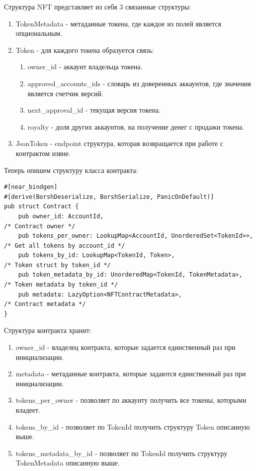 Структура NFT представляет из себя 3 связанные структуры:
\begin{enumerate}
    \item TokenMetadata - метаданные токена, где каждое из полей является опциональным.
    \item Token - для каждого токена образуется связь:
    \begin{enumerate}
        \item owner\_id - аккаунт владельца токена.
        \item approved\_accounts\_ids - словарь из доверенных аккаунтов, где значения является счетчик версий.
        \item next\_approval\_id - текущая версия токена.
        \item royalty - доля других аккаунтов, на получение денег с продажи токена.
    \end{enumerate}
    \item JsonToken - endpoint структура, которая возвращается при работе с контрактом извне.
\end{enumerate}

Теперь опишем структуру класса контракта:
\begin{verbatim}
#[near_bindgen]
#[derive(BorshDeserialize, BorshSerialize, PanicOnDefault)]
pub struct Contract {
    pub owner_id: AccountId,                                                /* Contract owner */
    pub tokens_per_owner: LookupMap<AccountId, UnorderedSet<TokenId>>,      /* Get all tokens by account_id */
    pub tokens_by_id: LookupMap<TokenId, Token>,                            /* Token struct by token_id */
    pub token_metadata_by_id: UnorderedMap<TokenId, TokenMetadata>,         /* Token metadata by token_id */
    pub metadata: LazyOption<NFTContractMetadata>,                          /* Contract metadata */
}
\end{verbatim}

Структура контракта хранит:
\begin{enumerate}
\item owner\_id - владелец контракта, которые задается единственный раз при инициализации.
\item metadata - метаданные контракта, которые задаются единственный раз при инициализации.
\item tokens\_per\_owner - позволяет по аккаунту получить все токены, которыми владеет.
\item tokens\_by\_id - позволяет по TokenId получить структуру Token описанную выше.
\item tokens\_metadata\_by\_id - позволяет по TokenId получить структуру TokenMetadata описанную выше.
\end{enumerate}


